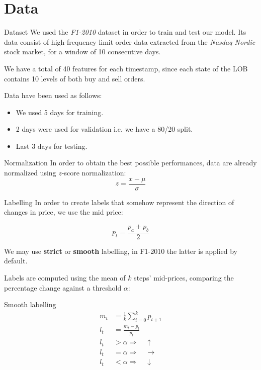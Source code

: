 \documentclass{beamer}
\begin{document}
\section{Data}
\begin{frame}{Dataset}
    We used the \textit{F1-2010} dataset in order to train and test our model.
    Its data consist of high-frequency limit order data extracted from the \textit{Nasdaq Nordic} stock market, for a window of 10 consecutive days.
\end{frame}

\begin{frame}
    We have a total of 40 features for each timestamp, since each state of the LOB contains 10 levels of both buy and sell orders.

    Data have been used as follows:
    \begin{itemize}
        \item We used 5 days for training.
        \item 2 days were used for validation i.e. we have a 80/20 split.
        \item Last 3 days for testing.
    \end{itemize}
\end{frame}

\begin{frame}{Normalization}
    In order to obtain the best possible performances, data are already normalized using $z$-score normalization:
    \begin{equation}
        z = \frac{x - \mu}{\sigma}
    \end{equation}
\end{frame}

\begin{frame}{Labelling}
    In order to create labels that somehow represent the direction of changes in price, we use the mid price:

    \begin{equation}
        p_t = \frac{p_a + p_b}{2}
    \end{equation}

    We may use \textbf{strict} or \textbf{smooth} labelling, in F1-2010 the latter is applied by default.

    Labels are computed using the mean of $k$ steps' mid-prices, comparing the percentage change against a threshold $\alpha$:
\end{frame}

\begin{frame}{Smooth labelling}
    \begin{align}
        m_t & = \frac{1}{k} \sum_{i=0}^k p_{t+1}     \\
        l_t & = \frac{m_t - p_t}{p_t}                \\
        l_t & > \alpha \Rightarrow \quad \uparrow    \\
        l_t & = \alpha \Rightarrow \quad \rightarrow \\
        l_t & < \alpha \Rightarrow \quad \downarrow
    \end{align}
\end{frame}
\end{document}
